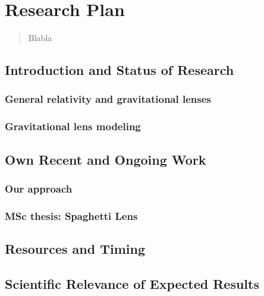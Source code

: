 \documentclass[12pt]{article}
\begin{document}
\newpage

\section*{Research Plan}

\begin{abstract}
Blabla
\end{abstract}


\subsection{Introduction and Status of Research}

\subsubsection{General relativity and gravitational lenses}

\subsubsection{Gravitational lens modeling}


\subsection{Own Recent and Ongoing Work}

\subsubsection{Our approach}

\subsubsection{MSc thesis: Spaghetti Lens}



\subsection{Resources and Timing}


\subsection{Scientific Relevance of Expected Results}





\end{document}
